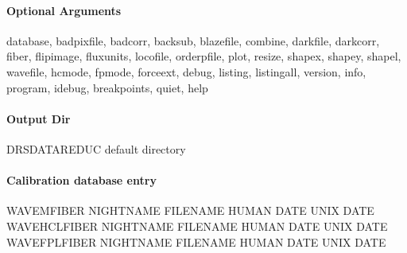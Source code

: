 \documentclass[a4paper,10pt,english]{report}
\begin{document}
\paragraph{Optional Arguments}
\label{\detokenize{user/spirou/recipes/wave_master:optional-arguments}}
\begin{sphinxVerbatim}[commandchars=\\\{\}]
\PYGZhy{}\PYGZhy{}database, \PYGZhy{}\PYGZhy{}badpixfile, \PYGZhy{}\PYGZhy{}badcorr, \PYGZhy{}\PYGZhy{}backsub, \PYGZhy{}\PYGZhy{}blazefile,
\PYGZhy{}\PYGZhy{}combine, \PYGZhy{}\PYGZhy{}darkfile, \PYGZhy{}\PYGZhy{}darkcorr,  \PYGZhy{}\PYGZhy{}fiber, \PYGZhy{}\PYGZhy{}flipimage,
\PYGZhy{}\PYGZhy{}fluxunits,  \PYGZhy{}\PYGZhy{}locofile, \PYGZhy{}\PYGZhy{}orderpfile, \PYGZhy{}\PYGZhy{}plot, \PYGZhy{}\PYGZhy{}resize,
\PYGZhy{}\PYGZhy{}shapex, \PYGZhy{}\PYGZhy{}shapey, \PYGZhy{}\PYGZhy{}shapel, \PYGZhy{}\PYGZhy{}wavefile, \PYGZhy{}hcmode, \PYGZhy{}fpmode,
\PYGZhy{}\PYGZhy{}forceext,
\PYGZhy{}\PYGZhy{}debug, \PYGZhy{}\PYGZhy{}listing, \PYGZhy{}\PYGZhy{}listingall, \PYGZhy{}\PYGZhy{}version, \PYGZhy{}\PYGZhy{}info,
\PYGZhy{}\PYGZhy{}program, \PYGZhy{}\PYGZhy{}idebug, \PYGZhy{}\PYGZhy{}breakpoints, \PYGZhy{}\PYGZhy{}quiet, \PYGZhy{}\PYGZhy{}help
\end{sphinxVerbatim}


\paragraph{Output Dir}
\label{\detokenize{user/spirou/recipes/wave_master:output-dir}}
\begin{sphinxVerbatim}[commandchars=\\\{\}]
DRS\PYGZus{}DATA\PYGZus{}REDUC    default  directory
\end{sphinxVerbatim}


\paragraph{Calibration database entry}
\label{\detokenize{user/spirou/recipes/wave_master:calibration-database-entry}}
\begin{sphinxVerbatim}[commandchars=\\\{\}]
WAVEM\PYGZus{}FIBER NIGHT\PYGZus{}NAME FILENAME HUMAN DATE UNIX DATE
WAVEHCL\PYGZus{}FIBER NIGHT\PYGZus{}NAME FILENAME HUMAN DATE UNIX DATE
WAVEFPL\PYGZus{}FIBER NIGHT\PYGZus{}NAME FILENAME HUMAN DATE UNIX DATE
\end{sphinxVerbatim}
\end{document}
